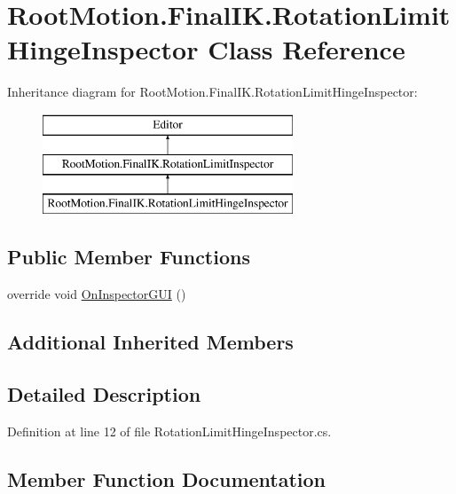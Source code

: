 \hypertarget{class_root_motion_1_1_final_i_k_1_1_rotation_limit_hinge_inspector}{}\section{Root\+Motion.\+Final\+I\+K.\+Rotation\+Limit\+Hinge\+Inspector Class Reference}
\label{class_root_motion_1_1_final_i_k_1_1_rotation_limit_hinge_inspector}
Inheritance diagram for Root\+Motion.\+Final\+I\+K.\+Rotation\+Limit\+Hinge\+Inspector\+:\begin{figure}[H]
\begin{center}
\leavevmode
\includegraphics[height=3.000000cm]{class_root_motion_1_1_final_i_k_1_1_rotation_limit_hinge_inspector}
\end{center}
\end{figure}
\subsection*{Public Member Functions}
\begin{DoxyCompactItemize}
\item 
override void \mbox{\hyperlink{class_root_motion_1_1_final_i_k_1_1_rotation_limit_hinge_inspector_a020a534543c62750303f57a6bba44688}{On\+Inspector\+G\+UI}} ()
\end{DoxyCompactItemize}
\subsection*{Additional Inherited Members}


\subsection{Detailed Description}


Definition at line 12 of file Rotation\+Limit\+Hinge\+Inspector.\+cs.



\subsection{Member Function Documentation}
\mbox{\label{class_root_motion_1_1_final_i_k_1_1_rotation_limit_hinge_inspector_a020a534543c62750303f57a6bba44688}} 
